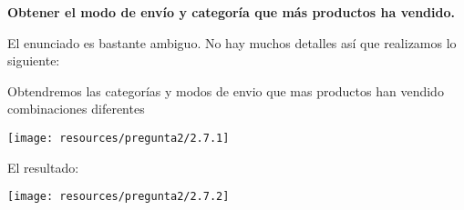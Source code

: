 \textbf{Obtener el modo de envío y categoría que más productos ha vendido.}

El enunciado es bastante ambiguo. No hay muchos detalles así que realizamos lo siguiente:

Obtendremos las categorías y modos de envio que mas productos han vendido combinaciones diferentes

\begin{center}
    \texttt{[image: resources/pregunta2/2.7.1]} \\
\end{center}
El resultado:
\begin{center}
    \texttt{[image: resources/pregunta2/2.7.2]} \\
\end{center}
